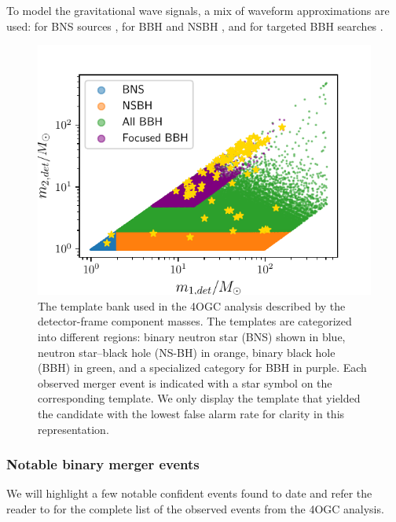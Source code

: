 To model the gravitational wave signals, a mix of waveform approximations are used:  for BNS sources \cite{Sathyaprakash:1991mt,Droz:1999qx,Blanchet:2004ek,Faye:2012we},  for BBH and NSBH \cite{Taracchini:2012ig,Bohe:2016gbl}, and  for targeted BBH searches \cite{Husa:2015iqa, Khan:2015jqa}.


\begin{figure}
    \centering
    \includegraphics[width=\linewidth]{figures/current_catalogs/bank.pdf}
    \caption{ The template bank used in the 4OGC analysis described by the detector-frame component masses. The templates are categorized into different regions: binary neutron star (BNS) shown in blue, neutron star–black hole (NS-BH) in orange, binary black hole (BBH) in green, and a specialized category for BBH in purple. Each observed merger event is indicated with a star symbol on the corresponding template. We only display the template that yielded the candidate with the lowest false alarm rate for clarity in this representation.}
    \label{fig:4OGC-bank}
\end{figure}


\subsubsection{Notable binary merger events}
We will highlight a few notable confident events found to date and refer the reader to \cite{Nitz:2021zwj} for the complete list of the observed events from the 4OGC analysis.\\

